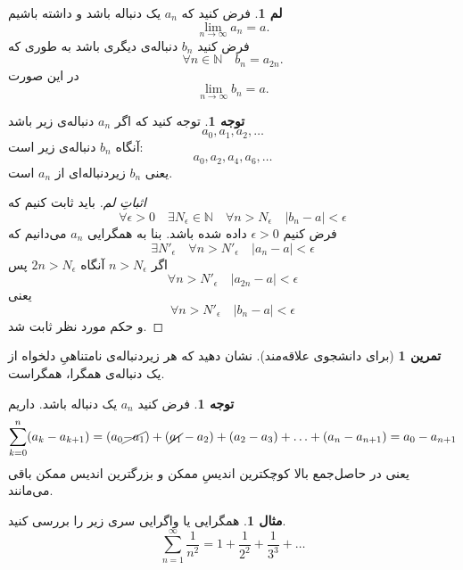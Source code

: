 \documentclass[12pt,a4paper]{article}
\theoremstyle{definition}
\newtheorem*{tam}{تمرین}
\newtheorem{mesal}[thm]{مثال}
\newtheorem{tav}[thm]{توجه}
\newtheorem{lem}[thm]{لم}
\begin{document}
\begin{lem}
فرض کنید 
که
$a_n$
یک دنباله باشد و داشته باشیم
\[\lim_{n \to \infty} a_n=a.\]
فرض کنید 
$b_n$
دنباله‌ی دیگری باشد به طوری که
\[
\forall n\in \mathbb{N}\quad b_{n}=a_{2n}.
\]
در این صورت
\[
\lim_{n \to \infty} b_{n}=a.
\]
\end{lem}
\begin{tav}
توجه کنید که اگر
$a_n$
دنباله‌ی زیر باشد
\[
a_0,a_1,a_2,\ldots
\]
آنگاه
$b_n$
دنباله‌ی زیر است:
\[
a_0,a_2,a_4,a_6,\ldots
\]
یعنی
$b_n$
زیردنباله‌ای از
$a_n$
است. 
\end{tav}
\begin{proof}[اثباتِ لم]
باید ثابت کنیم که
\[
\forall \epsilon>0 \quad \exists N_\epsilon\in \mathbb{N}\quad \forall n>N_\epsilon
\quad |b_n-a|<\epsilon
\]
فرض کنیم 
$\epsilon > 0$
داده شده باشد. بنا به همگرایی 
$a_n$
می‌دانیم که 
\[
\exists N'_\epsilon \quad \forall n >N'_\epsilon \quad |a_n-a|<\epsilon
\]
اگر 
$n>N_\epsilon$
آنگاه 
$2n>N_\epsilon$
پس
\[
\forall n>N'_\epsilon \quad |a_{2n}-a|<\epsilon
\]
یعنی
\[
\forall n>N'_\epsilon \quad |b_n-a|<\epsilon
\]
و حکم مورد نظر ثابت شد. 
\end{proof}
\begin{tam}[برای دانشجوی علاقه‌مند]
نشان دهید که هر زیردنباله‌ی نامتناهیِ دلخواه از یک دنباله‌ی همگرا، همگراست. 
\end{tam}
\begin{framed}
\begin{tav}
\label{ak-ak+1}
فرض کنید
$a_n$
یک دنباله‌ باشد. داریم
\[
\sum_{k=0}^{n} (a_k-a_{k+1})=(a_0\cancel{-a_1})+(\cancel{a_1}-a_2)+(a_2-a_3)+\ldots+(a_n-a_{n+1})=a_0-a_{n+1}
\]
یعنی
در حاصل‌جمع بالا
کوچکترین اندیسِ ممکن و بزرگترین اندیس ممکن  باقی‌ می‌مانند.
\end{tav}
\end{framed}
\begin{mesal}
همگرایی یا واگرایی سری زیر را بررسی کنید.
\[
\sum_{n=1}^{\infty} \frac{1}{n^2}=1+\frac{1}{2^2}+\frac{1}{3^3}+\ldots
\]
\end{mesal}
\end{document}
